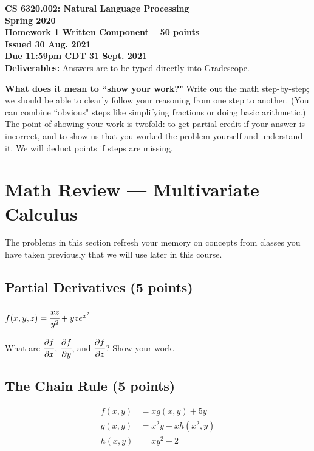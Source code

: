 \documentclass[12pt,a4paper]{article}
\begin{document}
\pagestyle{empty}

\textbf{CS 6320.002: Natural Language Processing} \\
\textbf{Spring 2020} \\

\textbf{Homework 1 Written Component -- 50 points} \\
\textbf{Issued 30 Aug. 2021} \\
\textbf{Due 11:59pm CDT 31 Sept. 2021} \\

\textbf{Deliverables:} Answers are to be typed directly into Gradescope.

\vspace{\baselineskip}

\textbf{What does it mean to ``show your work?"} Write out the math step-by-step; we should be able to clearly follow your reasoning from one step to another. (You can combine ``obvious" steps like simplifying fractions or doing basic arithmetic.) The point of showing your work is twofold: to get partial credit if your answer is incorrect, and to show us that you worked the problem yourself and understand it. We will deduct points if steps are missing.

\section{Math Review --- Multivariate Calculus}

The problems in this section refresh your memory on concepts from classes you have taken previously that we will use later in this course.

\subsection{Partial Derivatives (5 points)}

\begin{center}
$f(x, y, z) = \cfrac{xz}{y^2} + yz e^{x^2}$
\end{center}

What are $\cfrac{\partial f}{\partial x}$, $\cfrac{\partial f}{\partial y}$, and $\cfrac{\partial f}{\partial z}$? Show your work.

\subsection{The Chain Rule (5 points)}

\begin{align*}
f(x, y) &= xg(x,y) + 5y \\
g(x,y) &= x^2y - xh(x^2, y) \\
h(x, y) &= xy^2 + 2
\end{align*}
\end{document}
